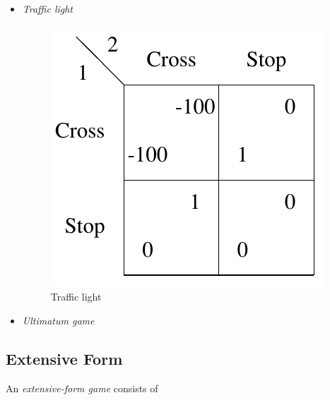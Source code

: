 \begin{itemize}
  \item \emph{Traffic light}

    \begin{figure}[H]
      \centering
      \includegraphics[width=\widthratio\paperwidth]{../img/traffic-light.png}
      \caption{Traffic light}
      \label{fig:traffic-light}
    \end{figure}

  \item \emph{Ultimatum game}
\end{itemize}

\subsection{Extensive Form}
\label{ssec:extensive-form}

An \emph{extensive-form game} consists of


